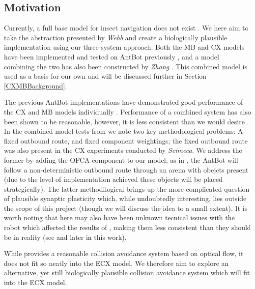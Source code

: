\documentclass[a4paper,11pt,twoside,openright]{article}
\begin{document}
\subsection{ Motivation }
Currently, a full base model for insect navigation does not exist
\cite{Webb2019}. We here aim to take the abstraction presented by
\textit{Webb} and create a biologically plausible implementation using
our three-system approach. Both the MB and CX models have been
implemented and tested on AntBot previously \cite{Scimeca2017,
  Mitchell2018, Eberding2016, Zhang2017}, and a model combining the
two has also been constructed by \textit{Zhang} \cite{Zhang2017}.
This combined model is used as a basis for our own and will be
discussed further in Section \ref{CXMBBackground}.
\newline
\par

The previous AntBot implementations have demonstrated good performance
of the CX and MB models individually \cite{Scimeca2017,
  Mitchell2018}. Performance of a combined system has also been shown
to be reasonable, however, it is less consistent than we would desire
\cite{Zhang2017}. In the combined model tests from \cite{Zhang2017} we
note two key methodological problems: A fixed outbound route, and
fixed component weightings; the fixed outbound route was also present
in the CX experiments conducted by \textit{Scimeca}. We address the
former by adding the OFCA component to our model; as in
\cite{Mitchell2018}, the AntBot will follow a non-deterministic
outbound route through an arena with obejcts present (due to the level
of implementation achieved these objects will be placed
strategically). The latter methodilogical brings up the
more complicated question of plausible synaptic plasticity which,
while undoubtedly interesting, lies outside the scope of this project
(though we will discuss the idea to a small extent). It is worth
noting that here may also have been unknown tecnical issues with the
robot which affected the results of \cite{Zhang2017}, making them less
consistent than they should be in reality (see \cite{Mitchell2018} and
later in this work).
\newline
\par

While \cite{Mitchell2018} provides a reasonable collision avoidance system
based on optical flow, it does not fit so neatly into the ECX model. We therefore
aim to explore an alternative, yet still biologically plausible collision
avoidance system which will fit into the ECX model.
\newline
\par
\end{document}
